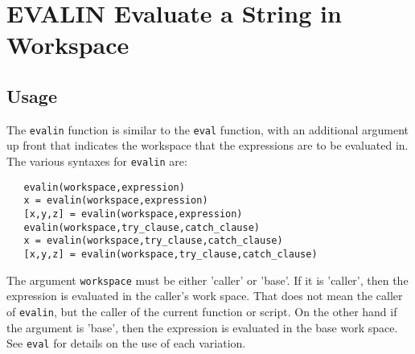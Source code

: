 \section{EVALIN Evaluate a String in Workspace}

\subsection{Usage}

The \verb|evalin| function is similar to the \verb|eval| function, with an additional
argument up front that indicates the workspace that the expressions are to 
be evaluated in.  The various syntaxes for \verb|evalin| are:
\begin{verbatim}
   evalin(workspace,expression)
   x = evalin(workspace,expression)
   [x,y,z] = evalin(workspace,expression)
   evalin(workspace,try_clause,catch_clause)
   x = evalin(workspace,try_clause,catch_clause)
   [x,y,z] = evalin(workspace,try_clause,catch_clause)
\end{verbatim}
The argument \verb|workspace| must be either 'caller' or 'base'.  If it is
'caller', then the expression is evaluated in the caller's work space.
That does not mean the caller of \verb|evalin|, but the caller of the current
function or script.  On the other hand if the argument is 'base', then
the expression is evaluated in the base work space.   See \verb|eval| for
details on the use of each variation.
